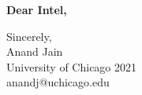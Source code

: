\documentclass[11pt]{letter} %
\begin{document}
\begin{letter}{}

\opening{\textbf{Dear Intel,}}



\begin{flushright}
    Sincerely, \\ Anand Jain \\ University of Chicago 2021 \\ anandj@uchicago.edu
\end{flushright} 

\end{letter}
 
\end{document}
